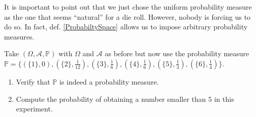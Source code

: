 \documentclass[a4paper,11pt,leqno]{report}
\begin{document}
It is important to point out that we just chose the uniform probability measure as the one that seems ``natural'' for
a die roll. However, nobody is forcing us to do so. In fact, def. \ref{ProbabiltySpace} allows us to impose arbitrary
probability measures.

\begin{Exercise}
Take $ (\Omega, \mathcal{A}, \mathbb{P}) $ with $ \Omega $ and $ \mathcal{A} $ as before but now use the 
probability measure $ \mathbb{P} = \{(\{1\},0), (\{2\}, \frac{1}{12}), (\{3\}, \frac{1}{6}), (\{4\}, \frac{1}{6}), (\{5\}, \frac{1}{3}),
(\{6\},\frac{1}{4}) \} $.
\begin{enumerate}
\item Verify that $ \mathbb{P} $ is indeed a probability measure.
\item Compute the probability of obtaining a number smaller than $ 5 $ in this experiment.
\end{enumerate}
\end{Exercise}
\end{document}
